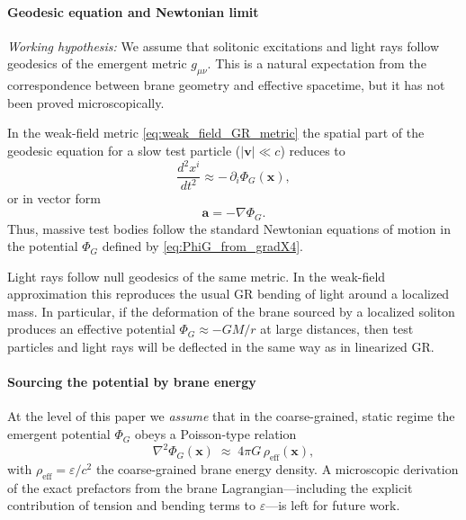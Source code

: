 \paragraph{Geodesic equation and Newtonian limit}

\textit{Working hypothesis:} We assume that solitonic excitations and light rays follow geodesics of the emergent metric $g_{\mu\nu}$. This is a natural expectation from the correspondence between brane geometry and effective spacetime, but it has not been proved microscopically.

In the weak-field metric \eqref{eq:weak_field_GR_metric} the spatial part of the geodesic equation for a slow test particle ($|\mathbf v| \ll c$) reduces to
\begin{equation}
  \frac{d^2 x^i}{dt^2} \approx -\,\partial_i \Phi_G(\mathbf x),
\end{equation}
or in vector form
\begin{equation}
  \mathbf a = - \nabla \Phi_G.
\end{equation}
Thus, massive test bodies follow the standard Newtonian equations of motion in the potential $\Phi_G$ defined by \eqref{eq:PhiG_from_gradX4}.

Light rays follow null geodesics of the same metric. In the weak-field approximation this reproduces the usual GR bending of light around a localized mass. In particular, if the deformation of the brane sourced by a localized soliton produces an effective potential $\Phi_G \approx -G M / r$ at large distances, then test particles and light rays will be deflected in the same way as in linearized GR.

\paragraph{Sourcing the potential by brane energy}

At the level of this paper we \emph{assume} that in the coarse-grained, static regime the emergent potential $\Phi_G$ obeys a Poisson-type relation
\begin{equation}
  \nabla^2 \Phi_G(\mathbf x)
  \;\approx\;
  4\pi G\,\rho_{\mathrm{eff}}(\mathbf x),
  \label{eq:Poisson_from_energy}
\end{equation}
with $\rho_{\mathrm{eff}} = \varepsilon/c^2$ the coarse-grained brane energy density. A microscopic derivation of the exact prefactors from the brane Lagrangian---including the explicit contribution of tension and bending terms to $\varepsilon$---is left for future work.

